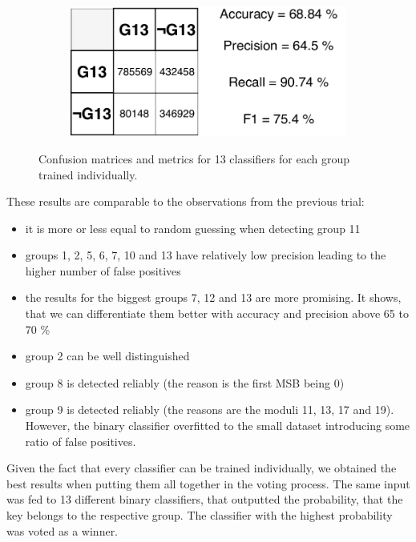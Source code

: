 \begin{figure}[H]
\vspace{3mm}
\begin{subfigure}{.33\textwidth}
  \centering
  \includegraphics[width=\textwidth]{tex/images/results/rese_g13}  
\end{subfigure}%

\caption{Confusion matrices and metrics for 13 classifiers for each group trained individually.}

\end{figure}

\noindent
These results are comparable to the observations from the previous trial:

\begin{itemize}

\item it is more or less equal to random guessing when detecting group 11
\item groups 1, 2, 5, 6, 7, 10 and 13 have relatively low precision leading to the higher number of false positives
\item the results for the biggest groups 7, 12 and 13 are more promising. It shows, that we can differentiate them better with accuracy and precision above 65 to 70 \%
\item group 2 can be well distinguished
\item group 8 is detected reliably (the reason is the first MSB being 0)
\item group 9 is detected reliably (the reasons are the moduli 11, 13, 17 and 19). However, the binary classifier overfitted to the small dataset introducing some ratio of false positives.

\end{itemize}

Given the fact that every classifier can be trained individually, we obtained the best results when putting them all together in the voting process. The same input was fed to 13 different binary classifiers, that outputted the probability, that the key belongs to the respective group. The classifier with the highest probability was voted as a winner.

